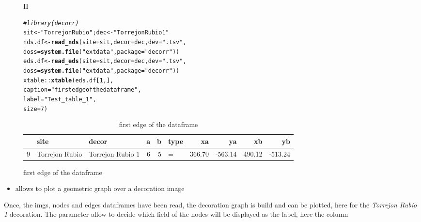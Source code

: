 \documentclass[article]{jss}\usepackage[]{graphicx}\usepackage[]{color}
\makeatletter
\newcommand{\hlnum}[1]{\textcolor[rgb]{0.686,0.059,0.569}{#1}}%
\newcommand{\hlstr}[1]{\textcolor[rgb]{0.192,0.494,0.8}{#1}}%
\newcommand{\hlcom}[1]{\textcolor[rgb]{0.678,0.584,0.686}{\textit{#1}}}%
\newcommand{\hlopt}[1]{\textcolor[rgb]{0,0,0}{#1}}%
\newcommand{\hlstd}[1]{\textcolor[rgb]{0.345,0.345,0.345}{#1}}%
\newcommand{\hlkwb}[1]{\textcolor[rgb]{0.69,0.353,0.396}{#1}}%
\newcommand{\hlkwc}[1]{\textcolor[rgb]{0.333,0.667,0.333}{#1}}%
\newcommand{\hlkwd}[1]{\textcolor[rgb]{0.737,0.353,0.396}{\textbf{#1}}}%
\newenvironment{kframe}{%
 \def\at@end@of@kframe{}%
 \ifinner\ifhmode%
  \def\at@end@of@kframe{\end{minipage}}%
  \begin{minipage}{\columnwidth}%
 \fi\fi%
 \def\FrameCommand##1{\hskip\@totalleftmargin \hskip-\fboxsep
 \colorbox{shadecolor}{##1}\hskip-\fboxsep
     \hskip-\linewidth \hskip-\@totalleftmargin \hskip\columnwidth}%
 \MakeFramed {\advance\hsize-\width
   \@totalleftmargin\z@ \linewidth\hsize
   \@setminipage}}%
 {\par\unskip\endMakeFramed%
 \at@end@of@kframe}
\makeatother
\begin{document}
\begin{figure}{H}
\centering
\begin{kframe}
\begin{alltt}
\hlcom{# library(decorr)}
\hlstd{sit} \hlkwb{<-} \hlstr{"Torrejon Rubio"} \hlstd{; dec} \hlkwb{<-} \hlstr{"Torrejon Rubio 1"}
\hlstd{nds.df} \hlkwb{<-} \hlkwd{read_nds}\hlstd{(}\hlkwc{site} \hlstd{= sit,} \hlkwc{decor} \hlstd{= dec,} \hlkwc{dev} \hlstd{=} \hlstr{".tsv"}\hlstd{,}
                   \hlkwc{doss} \hlstd{=} \hlkwd{system.file}\hlstd{(}\hlstr{"extdata"}\hlstd{,} \hlkwc{package} \hlstd{=} \hlstr{"decorr"}\hlstd{))}
\hlstd{eds.df} \hlkwb{<-} \hlkwd{read_eds}\hlstd{(}\hlkwc{site} \hlstd{= sit,} \hlkwc{decor} \hlstd{= dec,} \hlkwc{dev} \hlstd{=} \hlstr{".tsv"}\hlstd{,}
                   \hlkwc{doss} \hlstd{=} \hlkwd{system.file}\hlstd{(}\hlstr{"extdata"}\hlstd{,} \hlkwc{package} \hlstd{=} \hlstr{"decorr"}\hlstd{))}
\hlstd{xtable}\hlopt{::}\hlkwd{xtable}\hlstd{(eds.df[}\hlnum{1}\hlstd{,],}
               \hlkwc{caption}\hlstd{=}\hlstr{"first edge of the dataframe"}\hlstd{,}
               \hlkwc{label}\hlstd{=}\hlstr{"Test_table_1"}\hlstd{,}
               \hlkwc{size}\hlstd{=}\hlnum{7}\hlstd{)}
\end{alltt}
\end{kframe}%
\begin{table}[ht]
\centering
\begin{tabular}{rllrrlrrrr}
  \hline
 & site & decor & a & b & type & xa & ya & xb & yb \\ 
  \hline
9 & Torrejon Rubio & Torrejon Rubio 1 &   6 &   5 & = & 366.70 & -563.14 & 490.12 & -513.24 \\ 
   \hline
\end{tabular}
\caption{first edge of the dataframe} 
\label{Test_table_1}
\end{table}

\end{figure}

\begin{itemize}
  \item {} allows to plot a geometric graph over a decoration image
\end{itemize}

Once, the imgs, nodes and edges dataframes have been read, the decoration graph is build and can be plotted, here for the \emph{Torrejon Rubio 1} decoration. The  parameter allow to decide which field of the nodes will be displayed as the label, here the column 
\end{document}
